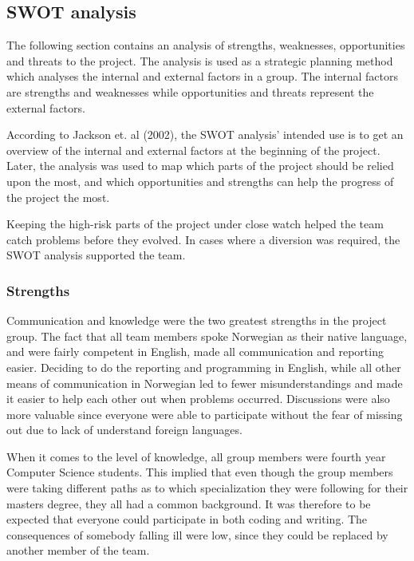\subsection{SWOT analysis}
The following section contains an analysis of strengths, weaknesses, opportunities and threats 
to the project. The analysis is used as a strategic planning method which analyses the internal 
and external factors in a group. The internal factors are strengths and weaknesses while 
opportunities and threats represent the external factors. 

According to Jackson et. al (2002)\cite{swot}, the SWOT analysis' intended use is to get an overview of the internal and external factors at the 
beginning of the project. Later, the analysis was used to map which parts of the project 
should be relied upon the most, and which opportunities and strengths can help the progress of 
the project the most.
 
Keeping the high-risk parts of the project under close watch helped the team catch problems 
before they evolved. In cases where a diversion was required, the SWOT analysis supported the 
team.

\subsubsection{Strengths}
Communication and knowledge were the two greatest strengths in the project group. The fact that all 
team members spoke Norwegian as their native language, and were fairly competent in English, made 
all communication and reporting easier. Deciding to do the reporting and programming in English, 
while all other means of communication in Norwegian led to fewer misunderstandings and made 
it easier to help each other out when problems occurred. Discussions were also more valuable 
since everyone were able to participate without the fear of missing out due to lack of understand 
foreign languages.
 
When it comes to the level of knowledge, all group members were fourth year Computer Science students. 
This implied that even though the group members were taking different paths as to which 
specialization they were following for their masters degree, they all had a common background. 
It was therefore to be expected that everyone could participate in both coding and writing. The 
consequences of somebody falling ill were low, since they could be replaced by another member of 
the team. 

